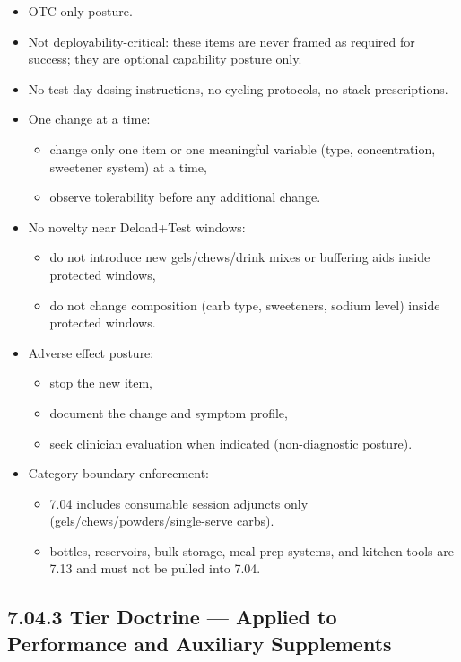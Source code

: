 \documentclass[10pt]{article}
\begin{document}
\begin{itemize}
\item OTC-only posture.
\item Not deployability-critical: these items are never framed as required for success; they are optional capability posture only.
\item No test-day dosing instructions, no cycling protocols, no stack prescriptions.
\item One change at a time:
  \begin{itemize}
  \item change only one item or one meaningful variable (type, concentration, sweetener system) at a time,
  \item observe tolerability before any additional change.
  \end{itemize}
\item No novelty near Deload+Test windows:
  \begin{itemize}
  \item do not introduce new gels/chews/drink mixes or buffering aids inside protected windows,
  \item do not change composition (carb type, sweeteners, sodium level) inside protected windows.
  \end{itemize}
\item Adverse effect posture:
  \begin{itemize}
  \item stop the new item,
  \item document the change and symptom profile,
  \item seek clinician evaluation when indicated (non-diagnostic posture).
  \end{itemize}
\item Category boundary enforcement:
  \begin{itemize}
  \item 7.04 includes consumable session adjuncts only (gels/chews/powders/single-serve carbs).
  \item bottles, reservoirs, bulk storage, meal prep systems, and kitchen tools are 7.13 and must not be pulled into 7.04.
  \end{itemize}
\end{itemize}

\subsection*{7.04.3 Tier Doctrine — Applied to Performance and Auxiliary Supplements}
{}
\end{document}
